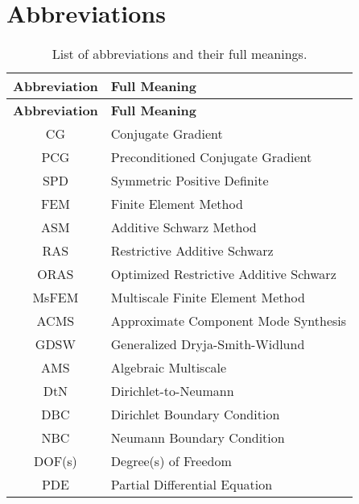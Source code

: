 \section*{Abbreviations}
\begin{longtable}{c p{10cm}}
    \caption{List of abbreviations and their full meanings.}\label{tab:abbreviations} \\
    \hline
    \textbf{Abbreviation} & \textbf{Full Meaning}                                     \\
    \hline
    \endfirsthead

    \hline
    \textbf{Abbreviation} & \textbf{Full Meaning}                                     \\
    \hline
    \endhead

    \hline
    \endfoot

    \hline
    \endlastfoot

    CG                    & Conjugate Gradient                                        \\
    PCG                   & Preconditioned Conjugate Gradient                         \\
    SPD                   & Symmetric Positive Definite                               \\
    FEM                   & Finite Element Method                                     \\
    ASM                   & Additive Schwarz Method                                   \\
    RAS                   & Restrictive Additive Schwarz                              \\
    ORAS                  & Optimized Restrictive Additive Schwarz                    \\
    MsFEM                 & Multiscale Finite Element Method                          \\
    ACMS                  & Approximate Component Mode Synthesis                      \\
    GDSW                  & Generalized Dryja-Smith-Widlund                           \\
    AMS                   & Algebraic Multiscale                                      \\
    DtN                   & Dirichlet-to-Neumann                                      \\
    DBC                   & Dirichlet Boundary Condition                              \\
    NBC                   & Neumann Boundary Condition                                \\
    DOF(s)                & Degree(s) of Freedom                                      \\
    PDE                   & Partial Differential Equation                             \\
\end{longtable}

\pagestyle{fancy}